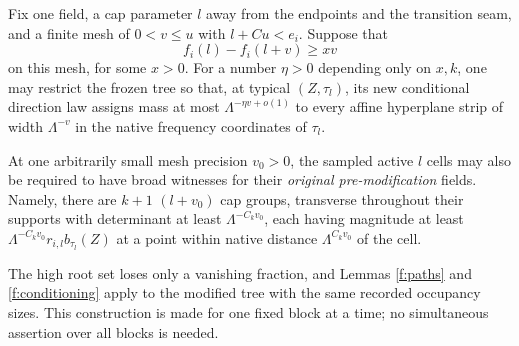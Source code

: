 \begin{lemma}\label{f:angular}
Fix one field, a cap parameter $l$ away from the endpoints and the
transition seam, and a finite mesh of $0<v\le u$ with $l+Cu<e_i$.
Suppose that
\[
 f_i(l)-f_i(l+v)\ge xv
\]
on this mesh, for some $x>0$. For a number $\eta>0$ depending only on
$x,k$, one may restrict the frozen tree so that, at typical $(Z,\tau_l)$,
its new conditional direction law assigns mass at most
$\Lambda^{-\eta v+o(1)}$ to every affine hyperplane strip of width
$\Lambda^{-v}$ in the native frequency coordinates of $\tau_l$.

At one arbitrarily small mesh precision $v_0>0$, the sampled active
$l$ cells may also be required to have broad witnesses for their
\emph{original pre-modification} fields. Namely, there are $k+1$
$(l+v_0)$ cap groups, transverse throughout their supports with
determinant at least $\Lambda^{-C_kv_0}$, each having magnitude at least
$\Lambda^{-C_kv_0}r_{i,l}b_{\tau_l}(Z)$ at a point within native
distance $\Lambda^{C_kv_0}$ of the cell.

The high root set loses only a vanishing fraction, and Lemmas
\ref{f:paths} and \ref{f:conditioning} apply to the modified tree with
the same recorded occupancy sizes. This construction is made for one
fixed block at a time; no simultaneous assertion over all blocks is
needed.
\end{lemma}

